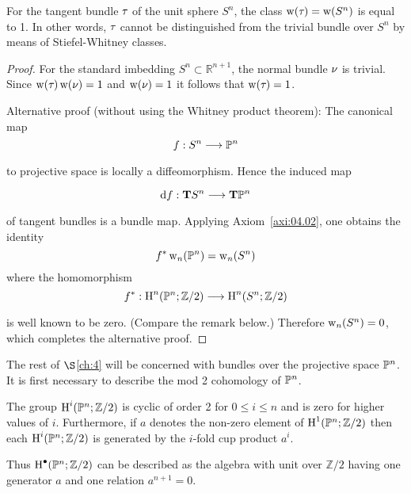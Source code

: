 \documentclass[../main]{subfiles}
\begin{document}
\begin{example}
\label{exa:04.01}
For the tangent bundle $\tau_{}$ of the unit sphere $S^{n}$, the class \newline $\operatorname{w}(\tau_{}) =\operatorname{w}(S^{n})$ is equal to 1. In other words, $\tau_{}$ cannot be distinguished from the trivial bundle over $S^{n}$ by means of Stiefel-Whitney classes.
\end{example}
\begin{proof}
For the standard imbedding $S^{n} \subset \mathbb{R}^{n+1}$, the normal bundle $\nu_{}$ is trivial. Since $\operatorname{w}(\tau_{}) \operatorname{w}(\nu_{})=1$ and $\operatorname{w}(\nu_{})=1$ it follows that $\operatorname{w}(\tau_{})=1$.


Alternative proof (without using the Whitney product theorem): The \mbox{canonical} map
\[
f: S^{n} \varrightarrow{} \projective^{n}
\]
to projective space is locally a diffeomorphism. Hence the induced map

\[
\tangentbundlemap{f}: \tangentTS S^{n} \varrightarrow{} \tangentTS \projective^{n}
\]
of tangent bundles is a bundle map. Applying Axiom~\ref{axi:04.02}, one obtains the identity
\[
f^{*} \operatorname{w}_{n}(\mathbb{P}^{n})=\operatorname{w}_{n}(S^{n})
\]
where the homomorphism
\[
f^{*}: \homology^{n}(\projective^{n}; \mathbb{Z} / 2) \varrightarrow{} \homology^{n}(S^{n}; \mathbb{Z} / 2)
\]
is well known to be zero. (Compare the remark below.) Therefore $\operatorname{w}_{n}(S^{n})=0$, which completes the alternative proof.

\end{proof}

The rest of $\S $\ref{ch:4} will be concerned with bundles over the projective space $\mathbb{P}^{n}$. It is first necessary to describe the mod 2 cohomology of $\mathbb{P}^{n}$.

\begin{lemma}
\label{lem:04.03}
The group $\operatorname{H}^i(\mathbb{P}^n; \mathbb{Z} / 2)$ is cyclic of order 2 for $0 \leq i \leq n$ and is zero for higher values of $i$. Furthermore, if $a$ denotes the non-zero element of $\operatorname{H}^1(\mathbb{P}^{n}; \mathbb{Z} / 2)$ then each $\operatorname{H}^i(\mathbb{P}^{n}; \mathbb{Z} / 2)$ is generated by the $i$-fold cup product $a^i$.
\end{lemma}

Thus $\operatorname{H}^\bullet(\mathbb{P}^{n}; \mathbb{Z} / 2)$ can be described as the algebra with unit over $\mathbb{Z} / 2$ having one generator $a$ and one relation $a^{n+1}=0$.
\end{document}
